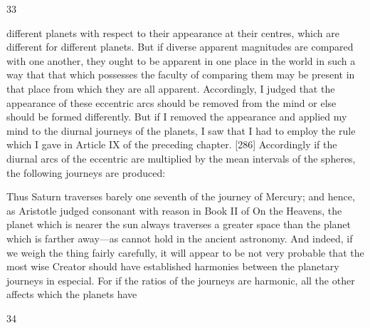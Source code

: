 \documentclass{article}
\begin{document}
33

different planets with respect to their appearance at their centres, which
are different for different planets. But if diverse apparent magnitudes are
compared with one another, they ought to be apparent in one place in
the world in such a way that that which possesses the faculty of
comparing them may be present in that place from which they are all
apparent. Accordingly, I judged that the appearance of these eccentric
arcs should be removed from the mind or else should be formed
differently. But if I removed the appearance and applied my mind to the
diurnal journeys of the planets, I saw that I had to employ the rule which
I gave in Article IX of the preceding chapter.
[286] Accordingly if the diurnal arcs of the eccentric are multiplied by
the mean intervals of the spheres, the following journeys are produced:

Thus Saturn traverses barely one seventh of the journey of Mercury; and
hence, as Aristotle judged consonant with reason in Book II of On the
Heavens, the planet which is nearer the sun always traverses a greater
space than the planet which is farther away—as cannot hold in the
ancient astronomy.
And indeed, if we weigh the thing fairly carefully, it will appear to be not
very probable that the most wise Creator should have established
harmonies between the planetary journeys in especial. For if the ratios of
the journeys are harmonic, all the other affects which the planets have


34
\end{document}
